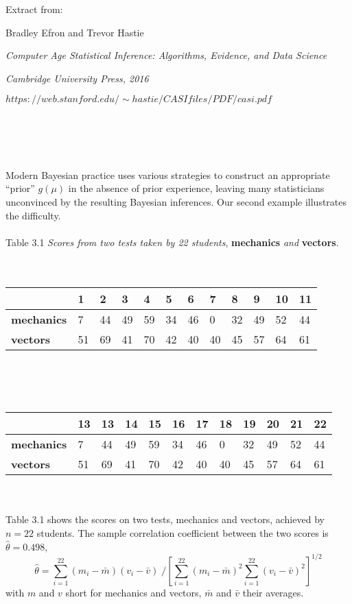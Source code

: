 \documentclass[13pt, letterpaper]{article}
\begin{document}
Extract from:

Bradley Efron and Trevor Hastie

\emph{Computer Age Statistical Inference: Algorithms, Evidence, and Data Science}

\emph{Cambridge University Press, 2016}

$https://web.stanford.edu/{\sim}hastie/CASIfiles/PDF/casi.pdf$ \\\\\\\\\

Modern Bayesian practice uses various strategies to construct an appropriate “prior” $ g(\mu) $ in the absence of prior experience, leaving many statisticians unconvinced by the resulting Bayesian inferences. Our second example illustrates the difficulty.\\
\\
Table 3.1 \textit{Scores from two tests taken by 22 students}, \textbf{mechanics} \emph{and} \textbf{vectors}.\\\\\
\begin{tabular}{llllllllllll}
                                    & 1  & 2  & 3  & 4  & 5  & 6  & 7  & 8  & 9  & 10 & 11 \\ \hline
\textbf{mechanics}    & 7  & 44 & 49 & 59 & 34 & 46 & 0  & 32 & 49 & 52 & 44 \\
\textbf{vectors}          & 51 & 69 & 41 & 70 & 42 & 40 & 40 & 45 & 57 & 64 & 61 \\ \hline
\end{tabular}
\\\\\\
\begin{tabular}{llllllllllll}
                                     & 13  & 13  & 14  & 15  & 16  & 17  & 18  & 19  & 20 & 21 & 22\\ \hline
\textbf{mechanics}     & 7  & 44 & 49 & 59 & 34 & 46 & 0  & 32 & 49 & 52 & 44 \\
\textbf{vectors}          & 51 & 69 & 41 & 70 & 42 & 40 & 40 & 45 & 57 & 64 & 61 \\ \hline
\end{tabular}\\\\

Table 3.1 shows the scores on two tests, mechanics and vectors, achieved by $n=22$ students. The sample correlation coefficient between the two scores is $\hat{\theta} = 0.498$,
$$\hat{\theta} = 
\sum_{i=1}^{22}(m_{i}-\bar{m})(v_{i}-\bar{v})\;
\Bigg/
\left[
\sum_{i=1}^{22}(m_{i}-\bar{m})^2\sum_{i=1}^{22}(v_{i}-\bar{v})^2
\right]^{1/2}
$$
with $m$ and $v$ short for mechanics and vectors, $\bar{m}$ and $\bar{v}$ their averages.
\end{document}
